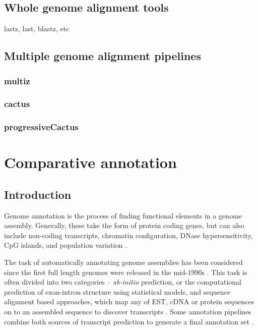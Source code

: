 \documentclass[fleqn,10pt]{wlscirep}
\begin{document}
\subsection{Whole genome alignment tools}
lastz, last, blastz, etc

\subsection{Multiple genome alignment pipelines}

\subsubsection{multiz}

\subsubsection{cactus}

\subsubsection{progressiveCactus}

\section{Comparative annotation}
\subsection{Introduction}
Genome annotation is the process of finding functional elements in a genome assembly. Generally, these take the form of protein coding genes, but can also include non-coding transcripts\cite{harrow2012gencode}, chromatin configuration, DNase hypersensitivity\cite{encode2004encode}, CpG islands, and population variation \cite{sherry2001dbsnp}.

The task of automatically annotating genome assemblies has been considered since the first full length genomes were released in the mid-1990s \cite{letovsky1998gdb,lukashin1998genemark,haussler1996generalized}. This task is often divided into two categories -- \textit{ab-initio} prediction, or the computational prediction of exon-intron structure using statistical models, and sequence alignment based approaches, which map any of EST, cDNA or protein sequences on to an assembled sequence to discover transcripts \cite{Aken01012016}. Some annotation pipelines combine both sources of transcript prediction to generate a final annotation set \cite{pruitt2006ncbi,cantarel2008maker}.
\end{document}
